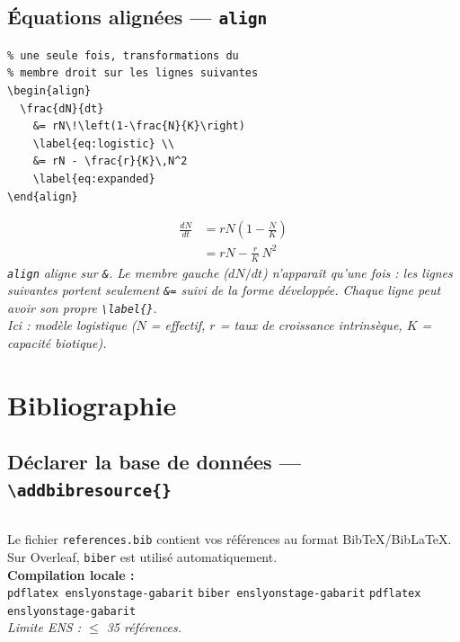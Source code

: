 \documentclass[12pt, a4paper]{article}
\begin{document}
\subsection{Équations alignées — \texttt{align}}

\begin{demo}
\begin{lstlisting}[style=latexcode]
% Croissance logistique — membre gauche
% une seule fois, transformations du
% membre droit sur les lignes suivantes
\begin{align}
  \frac{dN}{dt}
    &= rN\!\left(1-\frac{N}{K}\right)
    \label{eq:logistic} \\
    &= rN - \frac{r}{K}\,N^2
    \label{eq:expanded}
\end{align}
\end{lstlisting}
\tcblower
\begin{align}
  \frac{dN}{dt}
    &= rN\!\left(1-\frac{N}{K}\right)
    \label{eq:logistic} \\
    &= rN - \frac{r}{K}\,N^2
    \label{eq:expanded}
\end{align}
{\footnotesize\itshape \texttt{align} aligne sur \texttt{\&}. Le membre gauche ($dN/dt$) n'apparaît qu'une fois : les lignes suivantes portent seulement \texttt{\&=} suivi de la forme développée. Chaque ligne peut avoir son propre \texttt{\textbackslash label\{\}}.\\[4pt]
Ici : modèle logistique ($N$ = effectif, $r$ = taux de croissance intrinsèque, $K$ = capacité biotique).}
\end{demo}

\section{Bibliographie}

\subsection{Déclarer la base de données — \texttt{\textbackslash addbibresource\{\}}}

\begin{demo}
\begin{lstlisting}[style=latexcode]
% Dans le préambule :

\end{lstlisting}
\tcblower
{\footnotesize Le fichier \texttt{references.bib} contient vos références au format BibTeX/BibLaTeX. Sur Overleaf, \texttt{biber} est utilisé automatiquement.}\\[6pt]
{\footnotesize\textbf{Compilation locale :}\\
\texttt{pdflatex enslyonstage-gabarit} \textrightarrow{} \texttt{biber enslyonstage-gabarit} \textrightarrow{} \texttt{pdflatex enslyonstage-gabarit}}\\[6pt]
{\footnotesize\textit{Limite ENS : $\leqslant$ 35 références.}}
\end{demo}
\end{document}
